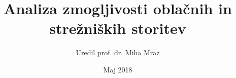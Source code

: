 \documentclass[slovene]{book}
\begin{document}
\author{Uredil prof. dr. Miha Mraz}
\title{Analiza zmogljivosti oblačnih in strežniških storitev}
\date{Maj 2018}
\maketitle

\frontmatter
\tableofcontents


\mainmatter

 
% 

\backmatter
%
%
\printindex %
\end{document}
